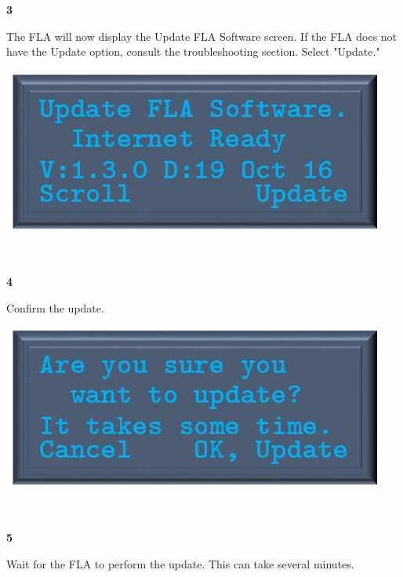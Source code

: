 \documentclass[11pt, oneside]{book}
\begin{document}
\noindent\begin{minipage}{0.45\textwidth}%
	\begin{center}
		\textbf{3}
	\end{center}
	The FLA will now display the Update FLA Software screen. If the FLA does not have the Update option, consult the troubleshooting section. Select "Update."
\end{minipage}%
\hfill%
\begin{minipage}{0.45\textwidth} 
	\includegraphics[width=\linewidth]{../media/pstricks_files/07_update_fla_software}
\end{minipage}\\[\baselineskip]
\noindent\begin{minipage}{0.45\textwidth}%
	\begin{center}
		\textbf{4}
	\end{center}
	Confirm the update.
\end{minipage}%
\hfill%
\begin{minipage}{0.45\textwidth} 
	\includegraphics[width=\linewidth]{../media/pstricks_files/07_update_confirm}
\end{minipage}\\[\baselineskip]
\noindent\begin{minipage}{0.45\textwidth}%
	\begin{center}
		\textbf{5}
	\end{center}
	Wait for the FLA to perform the update. This can take several minutes.
\end{minipage}%
\end{document}

